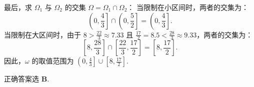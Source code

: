 {  最后，求 $\Omega_1$ 与 $\Omega_2$ 的交集 $\Omega = \Omega_1 \cap \Omega_2$：
  当限制在小区间时，两者的交集为：
  $$\left(0, \frac{4}{3}\right] \cap \left(0, \frac{5}{2}\right] = \left(0, \frac{4}{3}\right].$$
  当限制在大区间时，由于 $8 > \frac{22}{3} \approx 7.33$ 且 $\frac{17}{2} = 8.5 < \frac{28}{3} \approx 9.33$，两者的交集为：
  $$\left[8, \frac{28}{3}\right] \cap \left[\frac{22}{3}, \frac{17}{2}\right] = \left[8, \frac{17}{2}\right].$$
  因此，$\omega$ 的取值范围为 $\left(0, \frac{4}{3}\right] \cup \left[8, \frac{17}{2}\right]$.
  
  正确答案选 \textbf{B}.
}

\newcommand{\qTrigOmegaFourDiagnosis}{
  \errortag{双重条件交集计算失误}
  学生容易在求出两个复杂的并集区间后，在求交集时发生混乱，或者在讨论 $k$ 和 $m$ 的取值时漏掉某个分支. 这类涉及较多离散区间交集的计算，需要极度耐心与严密的画数轴辅助.
}

\newcommand{\qTrigOmegaFourTeachingNotes}{
  \teachblock{多条件处理}{
    对于包含多个复杂约束条件（如单调性、符号恒定等）的题目，推荐的解题流程是：
    1. 模块化：将各条件翻译为独立的关于 $\omega$ 的代数式.
    2. 分别求解：独立计算每个约束条件的解集 $\Omega_1, \Omega_2, \ldots$.
    3. 数轴合并：在草稿纸上画出数轴，将每个并集区间的各段清晰标记出来，最后取交集. 严禁凭感觉直接心算并集与交集的混合运算.
  }
}


\newcommand{\qTrigOmegaFiveStem}{
  已知函数 $f(x)=\sin\left(\omega x-\frac{\pi}{4}\right)$（其中 $\omega>0$）在区间 $(0,\pi)$ 上有且仅有 $2$ 个不同的零点，给出下列三个结论：
  
  (1) $f(x)$ 在区间 $[0,\pi]$ 上有且仅有 $2$ 条对称轴；
  
  (2) $f(x)$ 在区间 $\left(0,\frac{\pi}{3}\right)$ 上单调递增；
  
  (3) $\omega$ 的取值范围是 $\left(\frac{5}{4},\frac{9}{4}\right]$.
  
  其中正确结论的个数为（\quad）.
}

\newcommand{\qTrigOmegaFiveOptions}{
  \mcoptions[4]{$0$}{$1$}{$2$}{$3$}
}

\newcommand{\qTrigOmegaFiveAnswer}{C}


